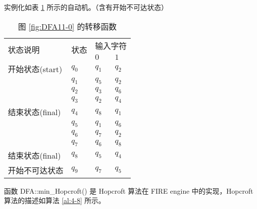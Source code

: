 实例化如表 \ref{tab:DFA411-1} 所示的自动机。（含有开始不可达状态）

\begin{table}[!htbp]
    \caption{图 \ref{fig:DFA11-0} 的转移函数}
    \label{tab:DFA411-1}
    \centering
    \small%
    \setlength{\tabcolsep}{4pt}%
    \renewcommand{\arraystretch}{1.2}%
        \begin{tabular}{l p{4em}<{\centering} p{3em}<{\centering} p{3em}<{\centering}}
        \toprule %
        \multirow{2}{*}{状态说明} & \multirow{2}{*}{状态} & \multicolumn{2}{c}{输入字符} \\
		\cline{3-4}      &    &$0$ & $1$  \\
        \midrule%
        开始状态(start)  & $q_0$ & $q_1$   & $q_2$   \\
                        & $q_1$ & $q_5$   & $q_2$   \\
                        & $q_2$ & $q_3$   & $q_6$   \\
                        & $q_3$ & $q_2$   & $q_4$   \\
        结束状态(final) & $q_4$ & $q_8$   & $q_1$   \\
                        & $q_5$ & $q_1$   & $q_6$   \\
                        & $q_6$ & $q_7$   & $q_2$   \\
                        & $q_7$ & $q_6$   & $q_8$   \\
        结束状态(final) & $q_8$ & $q_5$   & $q_4$   \\
        开始不可达状态    & $q_9$ & $q_7$   & $q_5$   \\
        \bottomrule%
    \end{tabular}
\end{table}

函数 DFA::min\_Hopcroft() 是 Hopcroft 算法在 FIRE engine 中的实现，Hopcroft 算法的描述如算法 \ref{al:4-8} 所示\cite{watson1993taxonomyb}。

